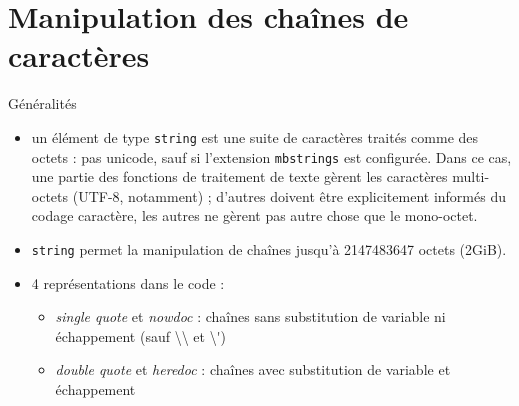 %

\section{Manipulation des chaînes de caractères}

\begin{frame}{Généralités}
	\begin{itemize}
		\item un élément de type \texttt{string} est une suite de caractères traités comme des octets : pas unicode, sauf si l’extension \texttt{mbstrings} est configurée. Dans ce cas, une partie des fonctions de traitement de texte gèrent les caractères multi-octets (UTF-8, notamment) ; d’autres doivent être explicitement informés du codage caractère, les autres ne gèrent pas autre chose que le mono-octet.
		\item \texttt{string} permet la manipulation de chaînes jusqu’à 2147483647 octets (2GiB).
		\item 4 représentations dans le code : 
		\begin{itemize}
			\item \emph{single quote} et \emph{nowdoc} : chaînes sans substitution de variable ni échappement (sauf \textbackslash{}\textbackslash{} et \textbackslash{}\'{})
			\item \emph{double quote} et \emph{heredoc} : chaînes avec substitution de variable et échappement
		\end{itemize}
	\end{itemize}
\end{frame}

